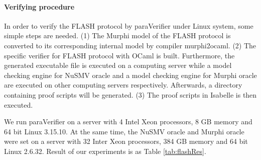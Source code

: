 \documentclass{llncs-new}
\newcommand{\bedt}[1]{{\color{black}#1}}
\newcommand{\forget}[1]{}
\begin{document}
\paragraph{Verifying \bedt{procedure}}  In order to verify the FLASH protocol by {\sf paraVerifier} under Linux system, some simple steps are needed. (1) The Murphi model of the FLASH protocol is converted to its corresponding internal model by compiler {\sf murphi2ocaml}. (2)  The specific verifier for FLASH protocol with OCaml is built. Furthermore, the generated executable file is  executed on a computing server while a model checking engine for NuSMV oracle and a model checking engine for Murphi oracle are executed on other computing servers respectively. Afterwards, a directory containing proof scripts will be generated. (3) The proof scripts in Isabelle is then executed.
\forget{
\begin{enumerate}[noitemsep,nolistsep]
\item The Murphi model of the FLASH protocol is converted to its corresponding internal model by compiler {\sf murphi2ocaml}.
\item The specific verifier for FLASH protocol with OCaml is built. Furthermore, the generated executable file is  executed on a computing server while a model checking engine for NuSMV oracle and a model checking engine for Murphi oracle are executed on other computing servers respectively. Afterwards, a directory containing proof scripts will be generated.
\item The proof scripts in Isabelle is then executed.
\end{enumerate}
}





We run {\sf paraVerifier} on a server with 4 Intel Xeon processors, 8 GB memory and 64 bit Linux 3.15.10. At the same time, the NuSMV oracle and Murphi oracle were set on a server with 32 Inter Xeon processors, 384 GB memory and 64 bit Linux 2.6.32. Result of our experiments is as Table \ref{tab:flashRes}.
\vspace{-10pt}
\end{document}
